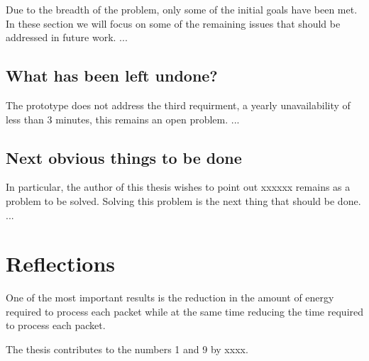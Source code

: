 \documentclass[../main.tex]{subfiles}
\begin{document}
Due to the breadth of the problem, only some of the initial goals have been
met. In these section we will focus on some of the remaining issues that
should be addressed in future work. ...

\subsection{What has been left undone?}
\label{what-has-been-left-undone}

The prototype does not address the third requirment, \ie a yearly unavailability of less than 3 minutes, this remains an open problem. ...




\subsection{Next obvious things to be done}

In particular, the author of this thesis wishes to point out xxxxxx remains as a problem to be solved. Solving this problem is the next thing that should be done. ...

\section{Reflections}
\label{sec:reflections}



One of the most important results is the reduction in the amount of
energy required to process each packet while at the same time reducing the
time required to process each packet.

The thesis contributes to the  numbers 1 and 9 by
xxxx. 
\end{document}
